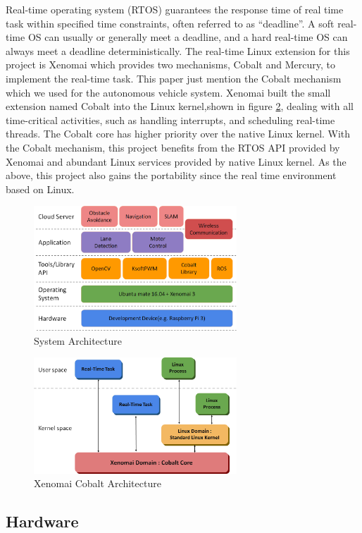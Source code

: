 \documentclass[conference]{IEEEtran}
\begin{document}
Real-time operating system (RTOS) guarantees the response time of real time task within specified time constraints, often referred to as “deadline”. A soft real-time OS can usually or generally meet a deadline, and a hard real-time OS can always meet a deadline deterministically. The real-time Linux extension for this project is Xenomai which provides two mechanisms, Cobalt and Mercury, to implement the real-time task. This paper just mention the Cobalt mechanism which we used for the autonomous vehicle system. Xenomai built the small extension named Cobalt into the Linux kernel,shown in figure \ref{fig:xeno_arch}, dealing with all time-critical activities, such as handling interrupts, and scheduling real-time threads. The Cobalt core has higher priority over the native Linux kernel. With the Cobalt mechanism, this project benefits from the RTOS API provided by Xenomai and abundant Linux services provided by native Linux kernel. As the above, this project also gains the portability since the real time environment based on Linux.

\begin{figure}
\centering
\includegraphics[width=3in]{img/arch.png}
\caption{System Architecture}
\label{fig:overall_arch}
\end{figure}

\begin{figure}
\centering
\includegraphics[width=3in]{img/xeno_arch.png}
\caption{Xenomai Cobalt Architecture}
\label{fig:xeno_arch}
\end{figure}

\subsection{Hardware}
\end{document}

